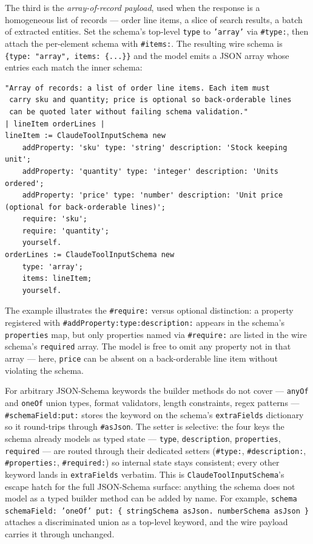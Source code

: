 \documentclass[a4paper,10pt,fleqn]{article}
\newcommand{\cls}[1]{\texttt{#1}}
\newcommand{\sel}[1]{\texttt{\##1}}
\begin{document}
The third is the \emph{array-of-record payload}, used when the
response is a homogeneous list of records --- order line items, a
slice of search results, a batch of extracted entities.  Set the
schema's top-level \texttt{type} to \texttt{'array'} via
\sel{type:}, then attach the per-element schema with \sel{items:}.
The resulting wire schema is \texttt{\{type: "array", items:
\{...\}\}} and the model emits a JSON array whose entries each
match the inner schema:

\begin{lstlisting}[language={}]
"Array of records: a list of order line items. Each item must
 carry sku and quantity; price is optional so back-orderable lines
 can be quoted later without failing schema validation."
| lineItem orderLines |
lineItem := ClaudeToolInputSchema new
    addProperty: 'sku' type: 'string' description: 'Stock keeping unit';
    addProperty: 'quantity' type: 'integer' description: 'Units ordered';
    addProperty: 'price' type: 'number' description: 'Unit price (optional for back-orderable lines)';
    require: 'sku';
    require: 'quantity';
    yourself.
orderLines := ClaudeToolInputSchema new
    type: 'array';
    items: lineItem;
    yourself.
\end{lstlisting}

\begin{sloppypar}
The example illustrates the \sel{require:} versus optional
distinction: a property registered with
\sel{addProperty:type:description:} appears in the schema's
\texttt{properties} map, but only properties named via
\sel{require:} are listed in the wire schema's \texttt{required}
array.  The model is free to omit any property not in that array
--- here, \texttt{price} can be absent on a back-orderable line
item without violating the schema.
\end{sloppypar}

\begin{sloppypar}
For arbitrary JSON-Schema keywords the builder methods do not
cover --- \texttt{anyOf} and \texttt{oneOf} union types, format
validators, length constraints, regex patterns ---
\sel{schemaField:put:} stores the keyword on the schema's
\texttt{extraFields} dictionary so it round-trips through
\sel{asJson}.  The setter is selective: the four keys the schema
already models as typed state --- \texttt{type}, \texttt{description},
\texttt{properties}, \texttt{required} --- are routed through their
dedicated setters (\sel{type:}, \sel{description:}, \sel{properties:},
\sel{required:}) so internal state stays consistent; every other
keyword lands in \texttt{extraFields} verbatim.  This is
\cls{ClaudeToolInputSchema}'s escape hatch for the full JSON-Schema
surface: anything the schema does not model as a typed builder method
can be added by name.  For example, \texttt{schema schemaField: 'oneOf'
put: \{ stringSchema asJson. numberSchema asJson \}} attaches a
discriminated union as a top-level keyword, and the wire payload
carries it through unchanged.
\end{sloppypar}
\end{document}
